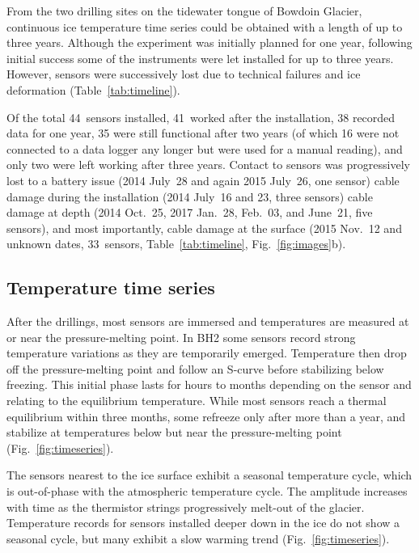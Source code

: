 \documentclass[utf8]{article}
\begin{document}
    From the two drilling sites on the tidewater tongue of Bowdoin Glacier,
    continuous ice temperature time series could be obtained with a length of
    up to three years. Although the experiment was initially planned for one
    year, following initial success some of the instruments were let installed
    for up to three years. However, sensors were successively lost due to
    technical failures and ice deformation (Table~\ref{tab:timeline}).

    Of the total 44~sensors installed, 41~worked after the installation, 38
    recorded data for one year, 35 were still functional after two years (of
    which 16 were not connected to a data logger any longer but were used for a
    manual reading), and only two were left
    working after three years. Contact to sensors was progressively lost to a
    battery issue (2014 July~28 and again 2015 July~26, one sensor) cable
    damage during the installation (2014 July~16 and 23, three sensors) cable
    damage at depth (2014 Oct.~25, 2017 Jan.~28, Feb.~03, and June~21, five
    sensors), and most importantly, cable damage at the surface (2015 Nov.~12
    and unknown dates, 33~sensors, Table~\ref{tab:timeline},
    Fig.~\ref{fig:images}b).


\subsection{Temperature time series}

    After the drillings, most sensors are immersed and temperatures are
    measured at or near the pressure-melting point. In BH2 some sensors record
    strong temperature variations as they are temporarily emerged. Temperature
    then drop off the pressure-melting point and follow an S-curve before
    stabilizing below freezing. This initial phase lasts for hours to months
    depending on the sensor and relating to the equilibrium temperature. While
    most sensors reach a thermal equilibrium within three months, some refreeze
    only after more than a year, and stabilize at temperatures below but near
    the pressure-melting point (Fig.~\ref{fig:timeseries}).

    The sensors nearest to the ice surface exhibit a seasonal temperature
    cycle, which is out-of-phase with the atmospheric temperature cycle. The
    amplitude increases with time as the thermistor strings progressively
    melt-out of the glacier. Temperature records for sensors installed deeper
    down in the ice do not show a seasonal cycle, but many exhibit a slow
    warming trend (Fig.~\ref{fig:timeseries}).
\end{document}
